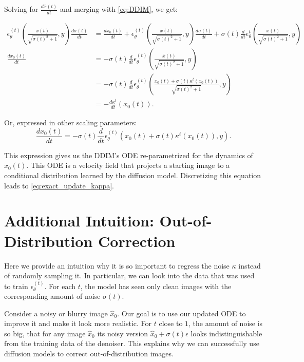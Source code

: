 Solving for $\frac{d \bar{x}(t)}{dt}$ and merging with \cref{eq:DDIM}, we get:
{\allowdisplaybreaks
\begin{align}
    \epsilon_\theta^{(t)}\left( 
        \frac{ \bar{x}(t)}{\sqrt{\sigma(t)^2 + 1}}, y
    \right) \frac{d \sigma(t)}{dt} 
    &= \frac{d x_0(t)}{dt}
    + \epsilon_\theta^{(t)}\left( 
        \frac{ \bar{x}(t)}{\sqrt{\sigma(t)^2 + 1}}, y
       \right) \frac{d \sigma(t)}{dt} 
    + \sigma(t) \frac{d}{dt} \epsilon_\theta^{t} \left( 
        \frac{ \bar{x}(t)}{\sqrt{\sigma(t)^2 + 1}}, y
      \right)\nonumber
      \\
        \frac{d x_0(t)}{dt} &= -\sigma(t) \frac{d}{dt} \epsilon_\theta^{(t)} \left( \frac{ \bar{x}(t) }{\sqrt{\sigma(t)^2 + 1}}, y\right)\nonumber\\
                            &= -\sigma(t) \frac{d}{dt} \epsilon_\theta^{(t)} \left( \frac{ x_0(t) + \sigma(t)\kappa^t(x_0(t)) }{\sqrt{\sigma(t)^2 + 1}}, y\right)\nonumber\\
                            &= -\frac{d\kappa^t}{dt} (x_0(t)).
\end{align}

Or, expressed in other scaling parameters:
\begin{equation}
    \label{eq:exact_update_kappa_ode}
    \frac{d x_0(t)}{dt} = -\sigma(t) \frac{d}{dt} \epsilon_\theta^{(t)} \left( x_0(t) + \sigma(t)\kappa^t(x_0(t)) , y\right) \text{.}
\end{equation}
}

This expression gives us the DDIM's ODE re-parametrized for the dynamics of $x_0(t)$. 
This ODE is a velocity field that projects a starting image to a conditional distribution learned by the diffusion model.
Discretizing this equation leads to \cref{eq:exact_update_kappa}.


\section{Additional Intuition: Out-of-Distribution Correction}\label{sec:oodview}

Here we provide an intuition why it is so important to regress the noise $\kappa$ instead of randomly sampling it.
In particular, we can look into the data that was used to train $\epsilon_\theta^{(t)}$.
For each $t$, the model has seen only clean images with the corresponding amount of noise $\sigma(t)$.

Consider a noisy or blurry image $\hat{x}_0$.
Our goal is to use our updated ODE to improve it and make it look more realistic.
For $t$ close to $1$, the amount of noise is so big, that for any image $\hat{x}_0$ its noisy version $\hat{x}_0 + \sigma(t)\epsilon$ looks indistinguishable from the training data of the denoiser. This explains why we can successfully use diffusion models to correct out-of-distribution images.

